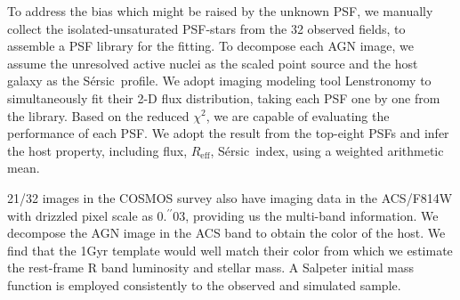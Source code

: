 \documentclass{natureprintstyle}
\newcommand{\hst}{{\it HST}}
\newcommand{\lhost}{$L_{\rm host}$}
\newcommand{\sersic}{S\'ersic}
\newcommand{\lenstronomy}{{\sc Lenstronomy}}
\newcommand{\reff}{{$R_{\mathrm{eff}}$}}
\newcommand{\mstar}{{$M_*$}}
\newcommand{\farcs}{\mbox{\ensuremath{.\!\!^{\prime\prime}}}}%
\begin{document}
To address the bias which might be raised by the unknown PSF, we manually collect the isolated-unsaturated PSF-stars from the 32 observed fields, to assemble a PSF library for the fitting. To decompose each AGN image, we assume the unresolved active nuclei as the scaled point source and the host galaxy as the \sersic\ profile. We adopt imaging modeling tool \lenstronomy\cite{lenstronomy} to simultaneously fit their 2-D flux distribution, taking each PSF one by one from the library. Based on the reduced $\chi^2$, we are capable of evaluating the performance of each PSF. We adopt the result from the top-eight PSFs and infer the host property, including flux, \reff, \sersic\ index, using a weighted arithmetic mean.

21/32 images in the COSMOS survey also have imaging data in the ACS/F814W with drizzled pixel scale as 0\farcs03, providing us the multi-band information. We decompose the AGN image in the ACS band to obtain the color of the host. We find that the 1Gyr template would well match their color from which we estimate the rest-frame R band luminosity and stellar mass. A Salpeter initial mass function is employed consistently to the observed and simulated sample.


\end{document}
